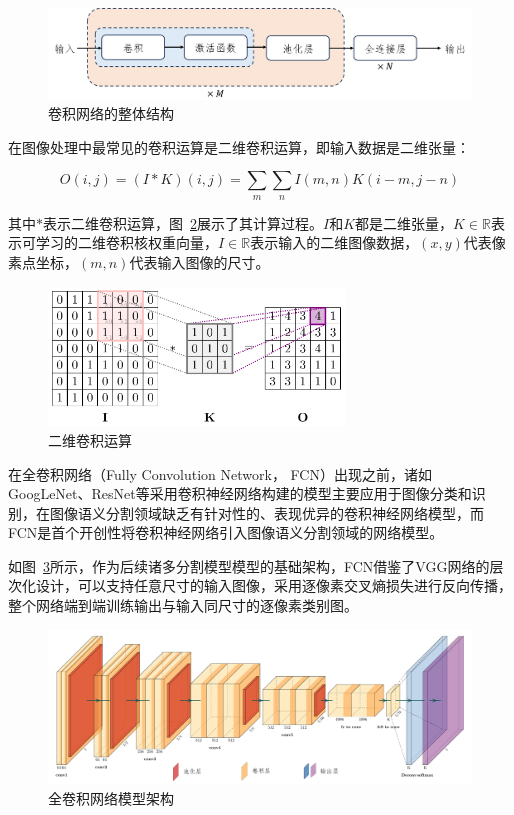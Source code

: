 \begin{figure}[htbp]
    \centering
    \includegraphics[width=\textwidth]{fig/cnn_frame.png}
    \caption{卷积网络的整体结构}
    \label{fig:cnn}
\end{figure}

在图像处理中最常见的卷积运算是二维卷积运算，即输入数据是二维张量：

\begin{equation}
    O(i, j)=(I * K)(i, j)=\sum_{m} \sum_{n} I(m, n) K(i-m, j-n)
\end{equation}

其中$*$表示二维卷积运算，图~\ref{fig:2dcnn}展示了其计算过程。$I$和$K$都是二维张量，$ K \in \mathbb{R}$表示可学习的二维卷积核权重向量，$I \in \mathbb{R}$表示输入的二维图像数据，$(x, y)$代表像素点坐标，$(m, n)$代表输入图像的尺寸。

\begin{figure}[!htbp]
    \centering
    \includegraphics[width=0.7\textwidth]{fig/2dcnn-1.png}
    \caption{二维卷积运算}
    \label{fig:2dcnn}
\end{figure}

在全卷积网络（Fully Convolution Network， FCN）出现之前，诸如GoogLeNet、ResNet等采用卷积神经网络构建的模型主要应用于图像分类和识别，在图像语义分割领域缺乏有针对性的、表现优异的卷积神经网络模型，而FCN是首个开创性将卷积神经网络引入图像语义分割领域的网络模型\cite{shelhamer2016}。

如图~\ref{fig:fcn_frame}所示，作为后续诸多分割模型模型的基础架构，FCN借鉴了VGG网络的层次化设计，可以支持任意尺寸的输入图像，采用逐像素交叉熵损失进行反向传播，整个网络端到端训练输出与输入同尺寸的逐像素类别图。

\begin{figure}[!htbp]
    \centering
    \includegraphics[width=\textwidth]{fig/fcn_frame.png}
    \caption{全卷积网络模型架构}
    \label{fig:fcn_frame}
\end{figure}

